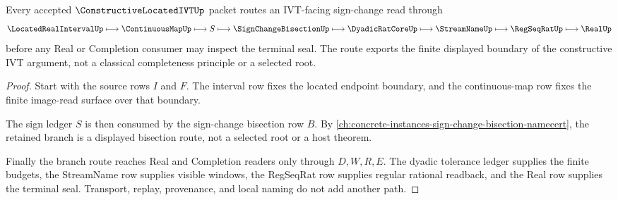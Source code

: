 \begin{theorem}
\label{thm:constructive-located-ivt-sign-change-route}
Every accepted $\ConstructiveLocatedIVTUp$ packet routes an IVT-facing sign-change read through
$$
\LocatedRealIntervalUp \longmapsto \ContinuousMapUp \longmapsto S \longmapsto \SignChangeBisectionUp \longmapsto \DyadicRatCoreUp \longmapsto \StreamNameUp \longmapsto \RegSeqRatUp \longmapsto \RealUp
$$
before any Real or Completion consumer may inspect the terminal seal. The route exports the finite displayed boundary of the constructive IVT argument, not a classical completeness principle or a selected root.
\end{theorem}
\begin{proof}
Start with the source rows $I$ and $F$. The interval row fixes the located endpoint boundary, and the continuous-map row fixes the finite image-read surface over that boundary.

The sign ledger $S$ is then consumed by the sign-change bisection row $B$. By \autoref{ch:concrete-instances-sign-change-bisection-namecert}, the retained branch is a displayed bisection route, not a selected root or a host theorem.

Finally the branch route reaches Real and Completion readers only through $D,W,R,E$. The dyadic tolerance ledger supplies the finite budgets, the StreamName row supplies visible windows, the RegSeqRat row supplies regular rational readback, and the Real row supplies the terminal seal. Transport, replay, provenance, and local naming do not add another path.
\end{proof}

